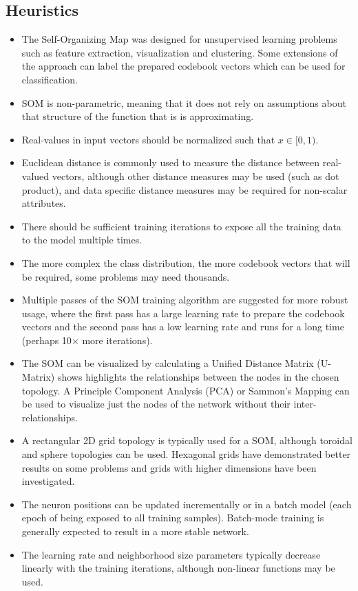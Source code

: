 \subsection{Heuristics}
\begin{itemize}
	\item The Self-Organizing Map was designed for unsupervised learning problems such as feature extraction, visualization and clustering. Some extensions of the approach can label the prepared codebook vectors which can be used for classification.
	\item SOM is non-parametric, meaning that it does not rely on assumptions about that structure of the function that is is approximating.
	\item Real-values in input vectors should be normalized such that $x \in [0,1)$. 
	\item Euclidean distance is commonly used to measure the distance between real-valued vectors, although other distance measures may be used (such as dot product), and data specific distance measures may be required for non-scalar attributes.
	\item There should be sufficient training iterations to expose all the training data to the model multiple times.
	\item The more complex the class distribution, the more codebook vectors that will be required, some problems may need thousands.
	\item Multiple passes of the SOM training algorithm are suggested for more robust usage, where the first pass has a large learning rate to prepare the codebook vectors and the second pass has a low learning rate and runs for a long time (perhaps 10$\times$ more iterations).
	\item The SOM can be visualized by calculating a Unified Distance Matrix (U-Matrix) shows highlights the relationships between the nodes in the chosen topology. A Principle Component Analysis (PCA) or Sammon's Mapping can be used to visualize just the nodes of the network without their inter-relationships.
	\item A rectangular 2D grid topology is typically used for a SOM, although toroidal and sphere topologies can be used. Hexagonal grids have demonstrated better results on some problems and grids with higher dimensions have been investigated. 
	\item The neuron positions can be updated incrementally or in a batch model (each epoch of being exposed to all training samples). Batch-mode training is generally expected to result in a more stable network.
	\item The learning rate and neighborhood size parameters typically decrease linearly with the training iterations, although non-linear functions may be used.
\end{itemize}

